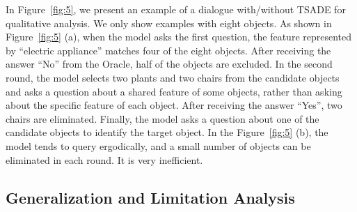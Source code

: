 In Figure~\ref{fig:5}, we present an example of a dialogue with/without TSADE for qualitative analysis. We only show examples with eight objects. As shown in Figure~\ref{fig:5} (a), when the model asks the first question, the feature represented by ``electric appliance'' matches four of the eight objects. After receiving the answer ``No'' from the Oracle, half of the objects are excluded. In the second round, the model selects two plants and two chairs from the candidate objects and asks a question about a shared feature of some objects, rather than asking about the specific feature of each object. After receiving the answer ``Yes'', two chairs are eliminated. Finally, the model asks a question about one of the candidate objects to identify the target object. In the Figure~\ref{fig:5} (b), the model tends to query ergodically, and a small number of objects can be eliminated in each round. It is very inefficient.




\subsection{Generalization and Limitation Analysis}


